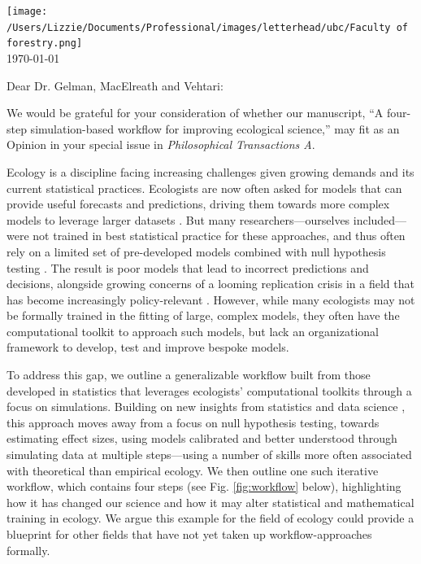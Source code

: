 \documentclass[11pt]{article}
\begin{document}

\renewcommand{\refname}{\CHead{}}

\hspace{-5ex} \texttt{[image: /Users/Lizzie/Documents/Professional/images/letterhead/ubc/Faculty of forestry.png]}
\vspace{1.5ex}\\

\setlength{\parindent}{0pt}
\setlength{\parskip}{7pt}
\today

Dear Dr. Gelman, MacElreath and Vehtari:

We would be grateful for your consideration of whether our manuscript, ``A four-step simulation-based workflow for improving ecological science,'' may fit as an Opinion in your special issue in \emph{Philosophical Transactions A}.

Ecology is a discipline facing increasing challenges given growing demands and its current statistical practices. Ecologists are now often asked for models that can provide useful forecasts and predictions, driving them towards more complex models to leverage larger datasets \citep{anderson2021trends,muff2022rewriting}. But many researchers---ourselves included---were not trained in best statistical practice for these approaches, and thus often rely on a limited set of pre-developed models combined with null hypothesis testing \citep{hobbs2006alternatives,quinn1983hypothesis}. The result is poor models that lead to incorrect predictions and decisions, alongside growing concerns of a looming replication crisis \citep{filazzola2021replication,fraser2020role} in a field that has become increasingly policy-relevant \citep{hak2016sustainable,lindenmayer2010science}.  However, while many ecologists may not be formally trained in the fitting of large, complex models, they often have the computational toolkit to approach such models, but lack an organizational framework to develop, test and improve bespoke models. 

To address this gap, we outline a generalizable workflow built from those developed in statistics  \citep{gelman2020bayesian,grinsztajn2021,vandeschoot2021} that leverages ecologists' computational toolkits through a focus on simulations. Building on new insights from statistics and data science \citep{gelman2020bayesian}, this approach moves away from a focus on null hypothesis testing, towards estimating effect sizes, using models calibrated and better understood through simulating data at multiple steps---using a number of skills more often associated with theoretical than empirical ecology. We then outline one such iterative workflow, which contains four steps (see Fig. \ref{fig:workflow} below), highlighting how it has changed our science and how it may alter statistical and mathematical training in ecology. We argue this example for the field of ecology could provide a blueprint for other fields that have not yet taken up workflow-approaches formally. 
\end{document}
